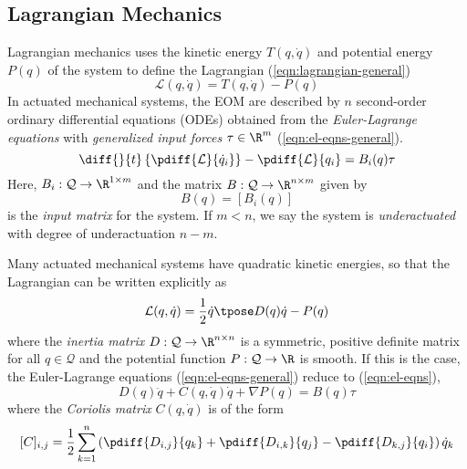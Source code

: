 \subsection{Lagrangian Mechanics}

Lagrangian mechanics uses the kinetic energy \(T(q,\dot{q})\) and potential
energy \(P(q)\) of the system to define the Lagrangian
(\ref{eqn:lagrangian-general})
\begin{equation}\label{eqn:lagrangian-general}
    \mathcal{L}(q,\dot{q}) = T(q,\dot{q}) - P(q)
\end{equation}
In actuated mechanical systems, the EOM are described by \(n\) second-order
ordinary differential equations (ODEs) obtained from the \textit{Euler-Lagrange
equations} with \textit{generalized input forces} \(\tau \in \R^m\) 
(\ref{eqn:el-eqns-general}). 
\begin{equation}\label{eqn:el-eqns-general}
    \diff{}{t}\left\{ \pdiff{\mathcal{L}}{\dot{q}_i} \right\}
    - \pdiff{\mathcal{L}}{q_i} = B_i(q) \tau
\end{equation}
Here, \(B_i: \mathcal{Q} \rightarrow \R^{1\times m}\)
and the matrix  \(B: \mathcal{Q} \rightarrow \R^{n \times m}\) given by
\[
    B(q) = [B_i(q)]
\]
is the \textit{input matrix} for the system. If \(m < n\), we say the system is
\textit{underactuated} with degree of underactuation \(n - m\).

Many actuated mechanical systems have quadratic kinetic energies, so that the
Lagrangian can be written explicitly as
\begin{equation}\label{eqn:lagrangian}
    \mathcal{L}(q,\dot{q}) = \frac{1}{2} \dot{q}\tpose D(q) \dot{q} - P(q)
\end{equation}
where the \textit{inertia matrix} \(D: \mathcal{Q} \rightarrow \R^{n\times n}\) 
is a symmetric, positive definite matrix for all \(q \in \mathcal{Q}\) and the
potential function \(P : \mathcal{Q} \rightarrow \R\) is smooth. 
If this is the case, the Euler-Lagrange equations
(\ref{eqn:el-eqns-general}) reduce to (\ref{eqn:el-eqns}),
\begin{equation}\label{eqn:el-eqns}
    D(q)\ddot{q} + C(q,\dot{q})\dot{q} + \nabla P(q) = B(q)\tau
\end{equation}
where the \textit{Coriolis matrix} \(C(q,\dot{q})\) is of the form
\[
    [C]_{i,j} = \frac{1}{2}\sum\limits_{k = 1}^n 
    \left(\pdiff{D_{i,j}}{q_k}  +
     \pdiff{D_{i,k}}{q_j} -
     \pdiff{D_{k,j}}{q_i}\right)\dot{q}_k
\]

